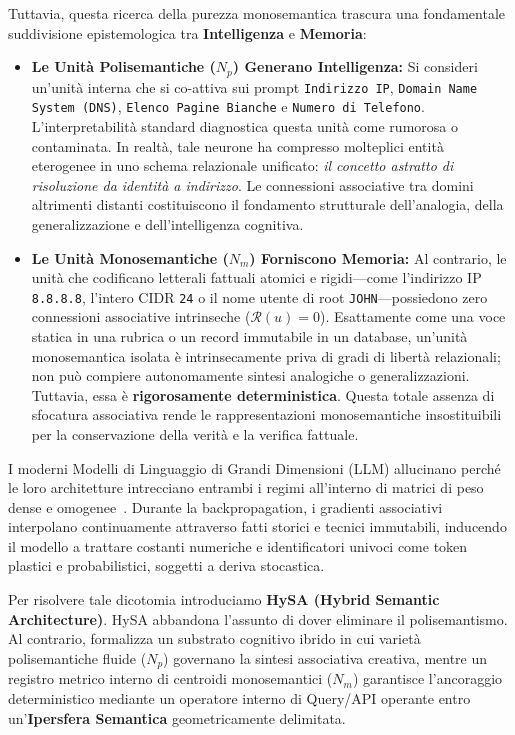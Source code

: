 \documentclass[11pt,a4paper]{article}
\theoremstyle{definition}
\begin{document}
Tuttavia, questa ricerca della purezza monosemantica trascura una fondamentale suddivisione epistemologica tra \textbf{Intelligenza} e \textbf{Memoria}:
\begin{itemize}[leftmargin=*, itemsep=2.5pt, topsep=3.0pt]
    \item \textbf{Le Unità Polisemantiche ($N_p$) Generano Intelligenza:} Si consideri un'unità interna che si co-attiva sui prompt \texttt{Indirizzo IP}, \texttt{Domain Name System (DNS)}, \texttt{Elenco Pagine Bianche} e \texttt{Numero di Telefono}. L'interpretabilità standard diagnostica questa unità come rumorosa o contaminata. In realtà, tale neurone ha compresso molteplici entità eterogenee in uno schema relazionale unificato: \textit{il concetto astratto di risoluzione da identità a indirizzo}. Le connessioni associative tra domini altrimenti distanti costituiscono il fondamento strutturale dell'analogia, della generalizzazione e dell'intelligenza cognitiva.
    \item \textbf{Le Unità Monosemantiche ($N_m$) Forniscono Memoria:} Al contrario, le unità che codificano letterali fattuali atomici e rigidi---come l'indirizzo IP \texttt{8.8.8.8}, l'intero CIDR \texttt{24} o il nome utente di root \texttt{JOHN}---possiedono zero connessioni associative intrinseche ($\mathcal{R}(u)=0$). Esattamente come una voce statica in una rubrica o un record immutabile in un database, un'unità monosemantica isolata è intrinsecamente priva di gradi di libertà relazionali; non può compiere autonomamente sintesi analogiche o generalizzazioni. Tuttavia, essa è \textbf{rigorosamente deterministica}. Questa totale assenza di sfocatura associativa rende le rappresentazioni monosemantiche insostituibili per la conservazione della verità e la verifica fattuale.
\end{itemize}

I moderni Modelli di Linguaggio di Grandi Dimensioni (LLM) allucinano perché le loro architetture intrecciano entrambi i regimi all'interno di matrici di peso dense e omogenee~\cite{geva2021transformer}. Durante la backpropagation, i gradienti associativi interpolano continuamente attraverso fatti storici e tecnici immutabili, inducendo il modello a trattare costanti numeriche e identificatori univoci come token plastici e probabilistici, soggetti a deriva stocastica.

Per risolvere tale dicotomia introduciamo \textbf{HySA (Hybrid Semantic Architecture)}. HySA abbandona l'assunto di dover eliminare il polisemantismo. Al contrario, formalizza un substrato cognitivo ibrido in cui varietà polisemantiche fluide ($N_p$) governano la sintesi associativa creativa, mentre un registro metrico interno di centroidi monosemantici ($N_m$) garantisce l'ancoraggio deterministico mediante un operatore interno di Query/API operante entro un'\textbf{Ipersfera Semantica} geometricamente delimitata.
\end{document}
